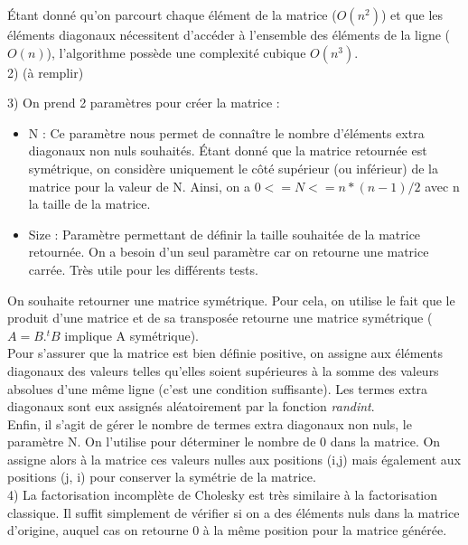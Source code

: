 \documentclass{article}
\begin{document}
    Étant donné qu'on parcourt chaque élément de la matrice ($O(n^{2})$) et que les éléments diagonaux nécessitent d'accéder à l'ensemble des éléments de la ligne ($O(n)$), l'algorithme possède une complexité cubique $O(n^{3})$. \\
    
    2) (à remplir)


    3) On prend 2 paramètres pour créer la matrice : \\
\begin{itemize}
    \item N : Ce paramètre nous permet de connaître le nombre d'éléments extra diagonaux non nuls souhaités. Étant donné que la matrice retournée est symétrique, on considère uniquement le côté supérieur (ou inférieur) de la matrice pour la valeur de N. Ainsi, on a $0 <= N <= n*(n-1)/2$ avec n la taille de la matrice. \\
    
    \item Size : Paramètre permettant de définir la taille souhaitée de la matrice retournée. On a besoin d'un seul paramètre car on retourne une matrice carrée. Très utile pour les différents tests. \\
\end{itemize}
    
On souhaite retourner une matrice symétrique. Pour cela, on utilise le fait que le produit d'une matrice et de sa transposée retourne une matrice symétrique ($A = B . ^tB$ implique A symétrique). \\

Pour s'assurer que la matrice est bien définie positive, on assigne aux éléments diagonaux des valeurs telles qu'elles soient supérieures à la somme des valeurs absolues d'une même ligne (c'est une condition suffisante). Les termes extra diagonaux sont eux assignés aléatoirement par la fonction \textit{randint}. \\

Enfin, il s'agit de gérer le nombre de termes extra diagonaux non nuls, le paramètre N. On l'utilise pour déterminer le nombre de 0 dans la matrice. On assigne alors à la matrice ces valeurs nulles aux positions (i,j) mais également aux positions (j, i) pour conserver la symétrie de la matrice. \\
    
  4) La factorisation incomplète de Cholesky est très similaire à la factorisation classique. Il suffit simplement de vérifier si on a des éléments nuls dans la matrice d'origine, auquel cas on retourne 0 à la même position pour la matrice générée. \\
  
\end{document}
